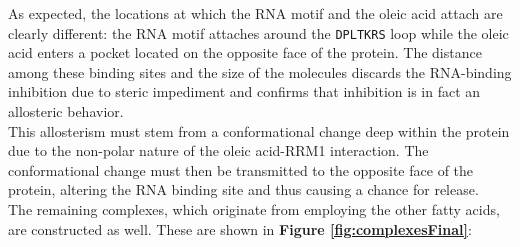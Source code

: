 As expected, the locations at which the RNA motif and the oleic acid attach are clearly different: the RNA motif attaches around the \texttt{DPLTKRS} loop while the oleic acid enters a pocket located on the opposite face of the protein. The distance among these binding sites and the size of the molecules discards the RNA-binding inhibition due to steric impediment and confirms that inhibition is in fact an allosteric behavior.\\

This allosterism must stem from a conformational change deep within the protein due to the non-polar nature of the oleic acid-RRM1 interaction. The conformational change must then be transmitted to the opposite face of the protein, altering the RNA binding site and thus causing a chance for release.\\

The remaining complexes, which originate from employing the other fatty acids, are constructed as well. These are shown in \textbf{Figure \ref{fig:complexesFinal}}:\pagebreak

